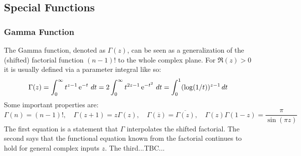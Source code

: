 




\subsection{Special Functions}

\subsubsection{Gamma Function}
The Gamma function, denoted as $\Gamma(z)$, can be seen as a generalization of the (shifted) factorial function $(n-1)!$ to the whole complex plane. For $\Re(z)>0$ it is usually defined via a parameter integral like so:
\begin{equation}
\Gamma(z) =	\int_{0}^{\infty} t^{z-1} \operatorname{\mathrm{e}}^{-t} \, dt 
          = 2 \int_{0}^{\infty} t^{2z-1} \operatorname{\mathrm{e}}^{-t^2} \, dt 
          = \int_{0}^{1} (\log(1/t))^{z-1}  \, dt 	
\end{equation}
Some important properties are:
\begin{equation}
\Gamma(n) = (n-1)!, \quad	
\Gamma(z+1) = z \Gamma(z), \quad
\Gamma(\overline{z}) = \overline{\Gamma(z)}, \quad
\Gamma(z) \Gamma(1-z) = \frac{\pi}{\sin(\pi z)}
\end{equation}
The first equation is a statement that $\Gamma$ interpolates the shifted factorial. The second says that the functional equation known from the factorial continues to hold for general complex inputs $z$. The third...TBC...







